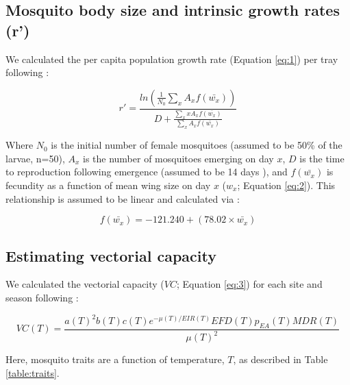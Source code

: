\documentclass[12pt]{article}
\begin{document}
\subsection{Mosquito body size and intrinsic growth rates (r')}

We calculated the per capita population growth rate (Equation \ref{eq:1}) per tray following \citet{livdahl1984}:

\begin{equation} \label{eq:1}
r' = \frac{ln(\frac{1}{N_0}\sum_{x}^{ }{A_x}f(\bar{w_x}))}{D+\frac{\sum_{x}^{ }xA_xf(\bar{w_x})}{\sum_{x}^{ }A_xf(\bar{w_x})}}
\end{equation}

Where $N_0$ is the initial number of female mosquitoes (assumed to be 50\% of the larvae, n=50), $A_x$ is the number of mosquitoes emerging on day $x$, $D$ is the time to reproduction following emergence (assumed to be 14 days \citep{livdahl1991}), and $f(\bar{w_x})$ is fecundity as a function of mean wing size on day $x$ ($w_x$; Equation \ref{eq:2}). This relationship is assumed to be linear and calculated via \citet{lounibos2002}:

\begin{equation} \label{eq:2}
f(\bar{w_x}) = -121.240 + (78.02 \times \bar{w_x})
\end{equation}

\subsection{Estimating vectorial capacity}
We calculated the vectorial capacity ($VC$; Equation \ref{eq:3}) for each site and season following \citet{mordecai2017}:

\begin{equation} \label{eq:3}
VC(T) =\frac{a(T)^2b(T)c(T)e^{-\mu (T)/EIR(T)} EFD(T) p_{EA}(T) MDR(T)} {\mu(T)^2}
\end{equation}

Here, mosquito traits are a function of temperature, $T$, as described in Table \ref{table:traits}.
\end{document}
